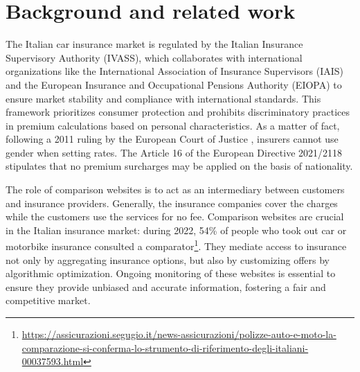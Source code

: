 \section{Background and related work}
\label{sec:rel-work}
The Italian car insurance market is regulated by the Italian Insurance Supervisory Authority (IVASS), which collaborates with international organizations like the International Association of Insurance Supervisors (IAIS) and the European Insurance and Occupational Pensions Authority (EIOPA) to ensure market stability and compliance with international standards. This framework prioritizes consumer protection and prohibits discriminatory practices in premium calculations based on personal characteristics. 
As a matter of fact, following a 2011 ruling by the European Court of Justice \cite{europeancourtofjusticeAssociationBelgeConsommateurs2011}, insurers cannot use gender when setting rates. The Article 16 of the European Directive 2021/2118 \cite{counciloftheeuropeanunionCouncilDirective20002000} stipulates that no premium surcharges may be applied on the basis of nationality.

The role of comparison websites is to act as an intermediary between customers and insurance providers. Generally, the insurance companies cover the charges while the customers use the services for no fee. Comparison websites are crucial in the Italian insurance market: during 2022, 54\% of people who took out car or motorbike insurance consulted a comparator\footnote{\href{https://assicurazioni.segugio.it/news-assicurazioni/polizze-auto-e-moto-la-comparazione-si-conferma-lo-strumento-di-riferimento-degli-italiani-00037593.html}{https://assicurazioni.segugio.it/news-assicurazioni/polizze-auto-e-moto-la-comparazione-si-conferma-lo-strumento-di-riferimento-degli-italiani-00037593.html}}. They mediate access to insurance not only by aggregating insurance options, but also by customizing offers by algorithmic optimization. Ongoing monitoring of these websites is essential to ensure they provide unbiased and accurate information, fostering a fair and competitive market.

